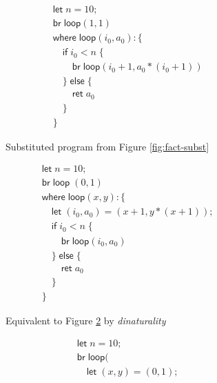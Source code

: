 \documentclass[acmsmall,screen,review]{acmart}
\newcommand{\ms}[1]{\ensuremath{\mathsf{#1}}}
\begin{document}
\begin{figure}
  \begin{minipage}{.5\textwidth}
    \begin{subfigure}{\textwidth}
      \begin{align*}
        & \ms{let}\;n = 10; \\
        & \ms{br}\;\ms{loop}(1, 1) \\
        & \ms{where}\;\ms{loop}(i_0, a_0): \{\\
        & \quad \ms{if}\;i_0 < n\;\{ \\
        & \qquad \ms{br}\;\ms{loop}(i_0 + 1, a_0 * (i_0 + 1)) \\
        & \quad \}\;\ms{else}\;\{ \\
        & \qquad \ms{ret}\;a_0 \\
        & \quad \} \\
        & \}
      \end{align*}
      \caption{Substituted program from Figure \ref{fig:fact-subst}}
      \label{fig:fact-subst-2}
    \end{subfigure}
    \begin{subfigure}{\textwidth}
      \begin{align*}
        & \ms{let}\;n = 10; \\
        & \ms{br}\;\ms{loop}\;(0, 1) \\
        & \ms{where}\;\ms{loop}(x, y): \{\\
        & \quad \ms{let}\;(i_0, a_0) = (x + 1, y * (x + 1)); \\
        & \quad \ms{if}\;i_0 < n\;\{ \\
        & \qquad \ms{br}\;\ms{loop}(i_0, a_0) \\
        & \quad \}\;\ms{else}\;\{ \\
        & \qquad \ms{ret}\;a_0 \\
        & \quad \} \\
        & \}
      \end{align*}
      \caption{Equivalent to Figure \ref{fig:fact-dinat} by \textit{dinaturality}}
      \label{fig:fact-dinat}
    \end{subfigure}
  \end{minipage}%
  \begin{subfigure}[c]{.5\textwidth}
    \begin{align*}
      & \ms{let}\;n = 10; \\
      & \ms{br}\;\ms{loop}( \\
      & \quad \ms{let}\;(x, y) = (0, 1); \\

\end{align*}
\end{subfigure}
\end{figure}
\end{document}
